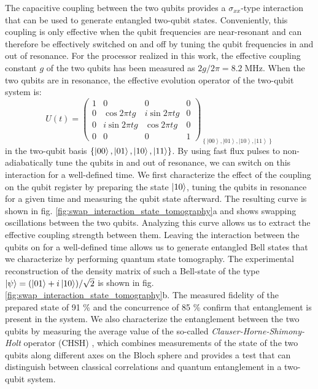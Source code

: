The capacitive coupling between the two qubits provides a $\sigma_{xx}$-type
interaction that can be used to generate entangled two-qubit states.
Conveniently, this coupling is only effective when the qubit frequencies
are near-resonant and can therefore be effectively switched on and
off by tuning the qubit frequencies in and out of resonance. For the
processor realized in this work, the effective coupling constant $g$
of the two qubits has been measured as $2g/2\pi=8.2\;\mathrm{MHz}$.
When the two qubits are in resonance, the effective evolution operator
of the two-qubit system is:
%
\begin{equation}
U(t)=\left(\begin{array}{cccc}
1 & 0 & 0 & 0\\
0 & \cos{2\pi tg} & i\sin{2\pi tg} & 0\\
0 & i\sin{2\pi tg} & \cos{2\pi tg} & 0\\
0 & 0 & 0 & 1\end{array}\right)_{\left\{ \left|00\right\rangle ,\left|01\right\rangle ,\left|10\right\rangle ,\left|11\right\rangle \right\} } \label{eq:swap_evolution_operator}
\end{equation}
%
in the two-qubit basis $\{\left| 00 \right>,\left| 01 \right>,\left| 10 \right>,\left| 11 \right>\}$. By using fast flux pulses to non-adiabatically tune the qubits in
and out of resonance, we can switch on this interaction for a well-defined
time. We first characterize the effect of the coupling on the qubit
register by preparing the state $\left| 10 \right>$, tuning the qubits in
resonance for a given time and measuring the qubit state afterward.
The resulting curve is shown in fig. \ref{fig:swap_interaction_state_tomography}a
and shows swapping oscillations between the two qubits. Analyzing
this curve allows us to extract the effective coupling strength between
them. Leaving the interaction between the qubits on for a well-defined
time allows us to generate entangled Bell states that we characterize
by performing quantum state tomography. The experimental reconstruction
of the density matrix of such a Bell-state of the type $\left| \psi \right>=(\left| 01 \right>+i\left| 10 \right>)/\sqrt{2}$
is shown in fig. \ref{fig:swap_interaction_state_tomography}b.
The measured fidelity of the prepared state of 91 \% and the concurrence
of 85 \% confirm that entanglement is present in the system. We also
characterize the entanglement between the two qubits by measuring the average value of the so-called \textit{Clauser-Horne-Shimony-Holt}
operator (CHSH) \citep{clauser_proposed_1969}, which
combines measurements of the state of the two qubits along different
axes on the Bloch sphere and provides a test that can distinguish
between classical correlations and quantum entanglement in a two-qubit
system.

